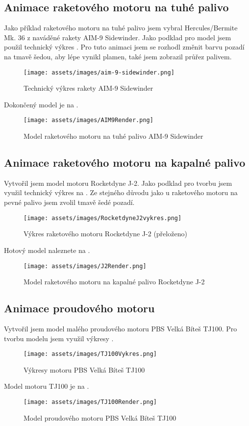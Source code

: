\subsection{Animace raketového motoru na tuhé palivo}
{Jako příklad raketového motoru na tuhé palivo jsem vybral Hercules/Bermite Mk. 36 z naváděné rakety AIM-9 Sidewinder. Jako podklad pro model jsem použil technický výkres . Pro tuto animaci jsem se rozhodl změnit barvu pozadí na tmavě šedou, aby lépe vynikl plamen, také jsem zobrazil průřez palivem.}
\cite{TB:AIM9Sidewinder}
\begin{figure}[H]
    \centering
    \texttt{[image: assets/images/aim-9-sidewinder.png]}
    \caption{Technický výkres rakety AIM-9 Sidewinder}
    \label{obr:AIM9vykres}
\end{figure}
{Dokončený model je na .}
\begin{figure}[H]
    \centering
    \texttt{[image: assets/images/AIM9Render.png]}
    \caption{Model raketového motoru na tuhé palivo AIM-9 Sidewinder \jaObr}
    \label{obr:AIM9Render}
\end{figure}
\newpage
\subsection{Animace raketového motoru na kapalné palivo}
{Vytvořil jsem model motoru Rocketdyne J-2. Jako podklad pro tvorbu jsem využil technický výkres na . Ze stejného důvodu jako u raketového motoru na pevné palivo jsem zvolil tmavě šedé pozadí.}
\cite{HR:F1RocketEngine}
\begin{figure}[H]
    \centering
    \texttt{[image: assets/images/RocketdyneJ2vykres.png]}
    \caption{Výkres raketového motoru Rocketdyne J-2 (přeloženo)}
    \label{obr:J2vykres}
\end{figure}
{Hotový model naleznete na .}
\begin{figure}[H]
    \centering
    \texttt{[image: assets/images/J2Render.png]}
    \caption{Model raketového motoru na kapalné palivo Rocketdyne J-2 \jaObr}
    \label{obr:J2Render}
\end{figure}
\newpage
\subsection{Animace proudového motoru}
{Vytvořil jsem model malého proudového motoru PBS Velká Bíteš TJ100. Pro tvorbu modelu jsem využil výkresy .}
\cite{PBS:Minijets}
\begin{figure}[H]
    \centering
    \texttt{[image: assets/images/TJ100Vykres.png]}
    \caption{Výkresy motoru PBS Velká Bíteš TJ100}
    \label{obr:PBSTJ100Vykres}
\end{figure}
{Model motoru TJ100 je na .}
\begin{figure}[H]
    \centering
    \texttt{[image: assets/images/TJ100Render.png]}
    \caption{Model proudového motoru PBS Velká Bíteš TJ100 \jaObr}
    \label{obr:TJ100Render}
\end{figure}
\newpage
